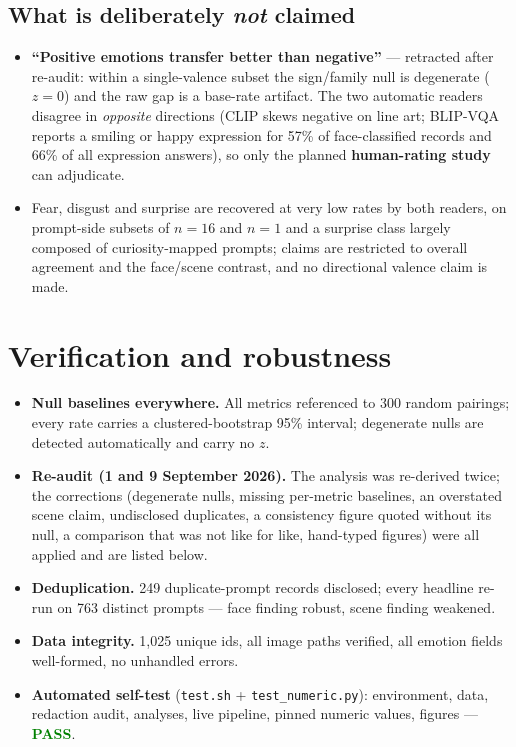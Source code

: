 \documentclass[11pt,a4paper]{article}
\newcommand{\pass}{\textcolor{green}{\textbf{PASS}}}
\begin{document}
\subsection{What is deliberately \emph{not} claimed}
\begin{itemize}
\item \textbf{``Positive emotions transfer better than negative''} --- retracted after re-audit: within a single-valence subset the sign/family null is degenerate ($z\!=\!0$) and the raw
gap is a base-rate artifact. The two automatic readers disagree in \emph{opposite} directions
(CLIP skews negative on line art; BLIP-VQA reports a smiling or happy expression for 57\% of
face-classified records and 66\% of all expression answers), so only the planned
\textbf{human-rating study} can adjudicate.
\item Fear, disgust and surprise are recovered at very low rates by both readers, on prompt-side
subsets of $n=16$ and $n=1$ and a surprise class largely composed of curiosity-mapped prompts; claims
are restricted to overall agreement and the face/scene contrast, and no directional valence claim is
made.
\end{itemize}

\section{Verification and robustness}
\begin{itemize}
\item \textbf{Null baselines everywhere.} All metrics referenced to 300 random pairings; every rate
carries a clustered-bootstrap 95\% interval; degenerate nulls are detected automatically and carry no $z$.
\item \textbf{Re-audit (1 and 9 September 2026).} The analysis was re-derived twice; the corrections
(degenerate nulls, missing per-metric baselines, an overstated scene claim, undisclosed duplicates,
a consistency figure quoted without its null, a comparison that was not like for like, hand-typed
figures) were all applied and are listed below.
\item \textbf{Deduplication.} 249 duplicate-prompt records disclosed; every headline re-run on 763
distinct prompts --- face finding robust, scene finding weakened.
\item \textbf{Data integrity.} 1{,}025 unique ids, all image paths verified, all emotion fields
well-formed, no unhandled errors.
\item \textbf{Automated self-test} (\texttt{test.sh} + \texttt{test\_numeric.py}): environment,
data, redaction audit, analyses, live pipeline, pinned numeric values, figures --- \pass.
\end{itemize}
\end{document}
